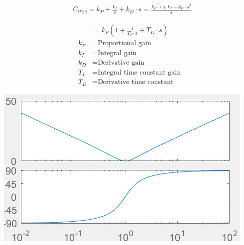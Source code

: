         \begin{scriptsize}
            \begin{align*}
                &C_{\text{PID}}= k_P + \frac{k_I}{s} + k_D \cdot s
                = \frac{k_P \cdot s + k_I + k_D \cdot s^2}{s}
            \end{align*}
        \end{scriptsize}
        \begin{minipage}{0.49\linewidth}
            \begin{scriptsize}
                \begin{align*}
                    &= k_P(1 + \frac{1}{T_I \cdot s} + T_D \cdot s)\\
                    k_P &= \text{Proportional gain}\\
                    k_I &= \text{Integral gain}\\
                    k_D &= \text{Derivative gain}\\
                    T_I &= \text{Integral time constant gain}\\
                    T_D &= \text{Derivative time constant}
                \end{align*}
            \end{scriptsize}
        \end{minipage}
        \begin{minipage}{0.49\linewidth}
            \includegraphics[width = \linewidth]{src/images/PID-controller.png}
        \end{minipage}
